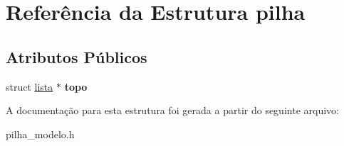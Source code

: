 \hypertarget{structpilha}{}\section{Referência da Estrutura pilha}
\label{structpilha}
\subsection*{Atributos Públicos}
\begin{DoxyCompactItemize}
\item 
\mbox{\label{structpilha_af710a80cc659420807a4e273fba075a1}} 
struct \hyperlink{structlista}{lista} $\ast$ {\bfseries topo}
\end{DoxyCompactItemize}


A documentação para esta estrutura foi gerada a partir do seguinte arquivo\+:\begin{DoxyCompactItemize}
\item 
pilha\+\_\+modelo.\+h\end{DoxyCompactItemize}
